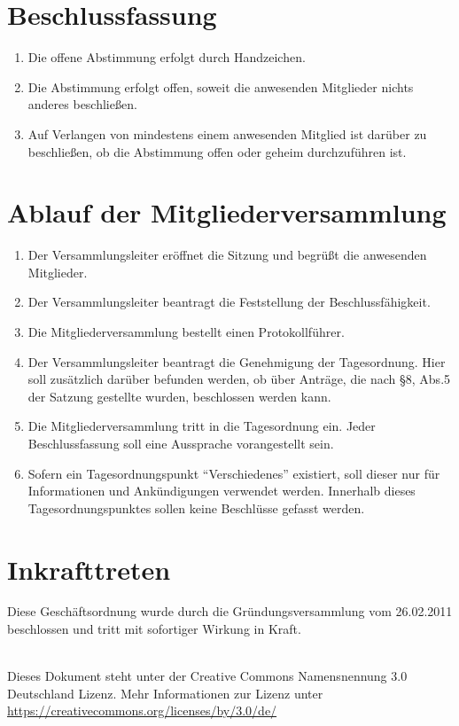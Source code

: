 \documentclass[a4paper, 12pt]{scrartcl}
\begin{document}
\section{Beschlussfassung}
\begin{enumerate}
	\item Die offene Abstimmung erfolgt durch Handzeichen.
	\item Die Abstimmung erfolgt offen, soweit die anwesenden Mitglieder nichts anderes beschließen.
	\item Auf Verlangen von mindestens einem anwesenden Mitglied ist darüber zu
beschließen, ob die Abstimmung offen oder geheim durchzuführen ist.
\end{enumerate}

\section{Ablauf der Mitgliederversammlung}
\begin{enumerate} 
	\item Der Versammlungsleiter eröffnet die Sitzung und begrüßt die anwesenden Mitglieder.
	\item Der Versammlungsleiter beantragt die Feststellung der Beschlussfähigkeit.
	\item Die Mitgliederversammlung bestellt einen Protokollführer.
	\item Der Versammlungsleiter beantragt die Genehmigung der Tagesordnung. Hier soll zusätzlich darüber befunden werden, ob über Anträge, die nach §8, Abs.5 der Satzung gestellte wurden, beschlossen werden kann.
	\item Die Mitgliederversammlung tritt in die Tagesordnung ein. Jeder Beschlussfassung soll eine Aussprache vorangestellt sein.
	\item Sofern ein Tagesordnungspunkt "`Verschiedenes"' existiert, soll dieser nur für Informationen und Ankündigungen verwendet werden. Innerhalb dieses Tagesordnungspunktes sollen keine Beschlüsse gefasst werden.
\end{enumerate}

\section{Inkrafttreten}
Diese Geschäftsordnung wurde durch die 
Gründungsversammlung
vom 26.02.2011 beschlossen und tritt mit sofortiger Wirkung in Kraft.\\

\vfill

\begin{flushright}
	\ccby \\
	{\small
		Dieses Dokument steht unter der Creative Commons Namensnennung 3.0 Deutschland Lizenz. Mehr Informationen zur Lizenz unter \url{https://creativecommons.org/licenses/by/3.0/de/}
	}
\end{flushright}
\end{document}
